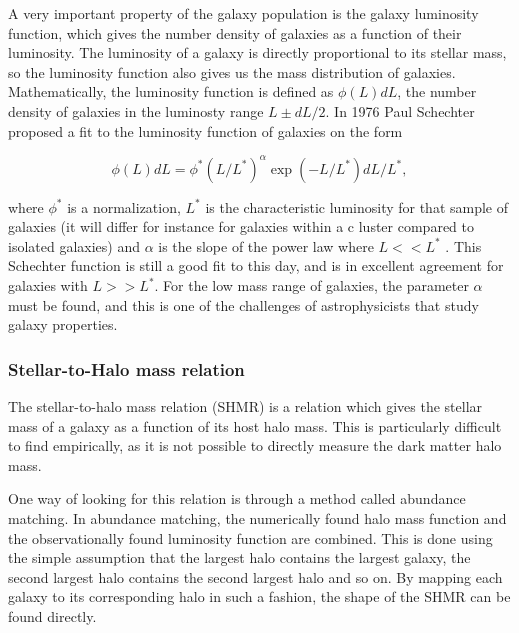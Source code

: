 A very important property of the galaxy population is the galaxy luminosity function, which gives the number density of galaxies as a function of their luminosity. The luminosity of a galaxy is directly proportional to its stellar mass, so the luminosity function also gives us the mass distribution of galaxies. Mathematically, the luminosity function is defined as $\phi(L)dL$, the number density of galaxies in the luminosty range $L \pm dL/2$. In 1976 Paul Schechter proposed a fit to the luminosity function of galaxies on the form

\begin{equation}
    \phi(L)dL = \phi^*(L/L^*)^{\alpha}\exp{(-L/L^*)}dL/L^*,
\end{equation}

where $\phi^*$ is a normalization, $L^*$ is the characteristic luminosity for that sample of galaxies (it will differ for instance for galaxies within a c luster compared to isolated galaxies) and $\alpha$ is the slope of the power law where $L<<L^*$ \parencite{Schechter1976}. This Schechter function is still a good fit to this day, and is in excellent agreement for galaxies with $L>>L^*$. For the low mass range of galaxies, the parameter $\alpha$ must be found, and this is one of the challenges of astrophysicists that study galaxy properties.


\subsubsection{Stellar-to-Halo mass relation}

The stellar-to-halo mass relation (SHMR) is a relation which gives the stellar mass of a galaxy as a function of its host halo mass. This is particularly difficult to find empirically, as it is not possible to directly measure the dark matter halo mass. 

One way of looking for this relation is through a method called abundance matching. In abundance matching, the numerically found halo mass function and the observationally found luminosity function are combined. This is done using the simple assumption that the largest halo contains the largest galaxy, the second largest halo contains the second largest halo and so on. By mapping each galaxy to its corresponding halo in such a fashion, the shape of the SHMR can be found directly.

